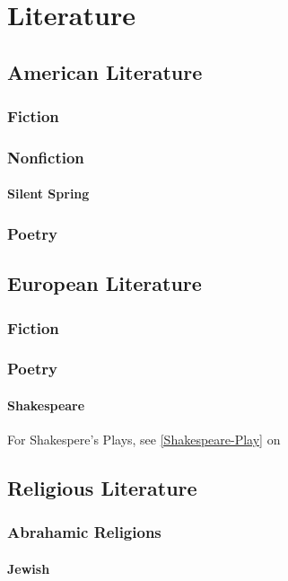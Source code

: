 \chapter{Literature}
	\section{American Literature}
		\subsection{Fiction}
		\subsection{Nonfiction}
			\subsubsection{Silent Spring}
		\subsection{Poetry}

			

		
	\section{European Literature}
		\subsection{Fiction}
		\subsection{Poetry}
		\subsubsection{Shakespeare} \label{Shakespeare-Poetry} For Shakespere's Plays, see \ref{Shakespeare-Play} on 
		
	\newpage
	\section{Religious Literature}
		\subsection{Abrahamic Religions}
			\subsubsection{Jewish}
